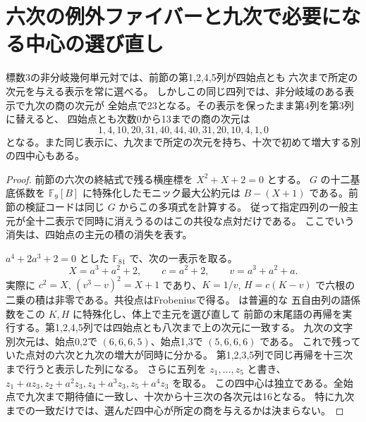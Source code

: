 \section{六次の例外ファイバーと九次で必要になる中心の選び直し}
\label{sec:rank-fifteen-fixed-center-obstruction}
\begin{proposition}
標数3の非分岐幾何単元対では、前節の第1,2,4,5列が四始点とも
六次まで所定の次元を与える表示を常に選べる。
しかしこの同じ四列では、非分岐域のある表示で九次の商の次元が
全始点で23となる。その表示を保ったまま第4列を第3列に替えると、
四始点とも次数0から13までの商の次元は
\[
1,4,10,20,31,40,44,40,31,20,10,4,1,0
\]
となる。また同じ表示に、九次まで所定の次元を持ち、十次で初めて増大する別の四中心もある。
\end{proposition}
\begin{proof}
前節の六次の終結式で残る横座標を $X^2+X+2=0$ とする。
$G$ の十二基底係数を $\mathbb F_9[B]$ に特殊化したモニック最大公約元は
$B-(X+1)$ である。前節の検証コードは同じ $G$ からこの多項式を計算する。
従って指定四列の一般主元が全十二表示で同時に消えうるのはこの共役な点対だけである。
ここでいう消失は、四始点の主元の積の消失を表す。

$a^4+2a^3+2=0$ とした $\mathbb F_{81}$ で、次の一表示を取る。
\[
 X=a^3+a^2+2,\qquad c=a^2+2,\qquad v=a^3+a^2+a.
\]
実際に $c^2=X$, $(v^3-v)^2=X+1$ であり、$K=1/v$, $H=c(K-v)$
で六根の二乗の積は非零である。共役点はFrobeniusで得る。
 は普遍的な
五自由列の語係数をこの $K,H$ に特殊化し、体上で主元を選び直して
前節の末尾語の再帰を実行する。第1,2,4,5列では四始点とも八次まで上の次元に一致する。
九次の文字別次元は、始点0,2で $(6,6,6,5)$、始点1,3で $(5,6,6,6)$ である。
これで残っていた点対の六次と九次の増大が同時に分かる。
第1,2,3,5列で同じ再帰を十三次まで行うと表示した列になる。
さらに五列を $z_1,\ldots,z_5$ と書き、$z_1+az_3,z_2+a^2z_3,z_4+a^3z_3,z_5+a^4z_3$ を取る。
この四中心は独立である。全始点で九次まで期待値に一致し、十次から十三次の各次元は16となる。
特に九次までの一致だけでは、選んだ四中心が所定の商を与えるかは決まらない。
\end{proof}
